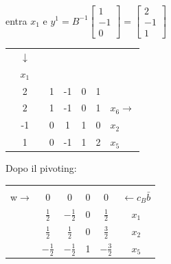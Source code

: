 entra $x_{1}$ e $y^{1}=B^{-1}\begin{bmatrix}1\\-1\\0\end{bmatrix}=\begin{bmatrix}2\\-1\\1\end{bmatrix}$
\begin{table}[H]
	\centering
	\begin{tabular}{r|c|c|ccc|c|l}
		\multicolumn{1}{c}{} & \multicolumn{1}{c}{$\downarrow$} & \multicolumn{1}{c}{} &  &  & \multicolumn{1}{c}{} & \multicolumn{1}{c}{} & \\
		\multicolumn{1}{c}{} & \multicolumn{1}{c}{$x_{1}$} & \multicolumn{1}{c}{} &  &  & \multicolumn{1}{c}{} & \multicolumn{1}{c}{} & \\ \cline{2-2} \cline{4-7}
		& 2 &  & 1 & -1 & 0 & 1 &  \\ \cline{2-2} \cline{4-7}
		& {\LARGE \textcircled{\normalsize $2$}} &  & 1 & -1 & 0 & 1 & $x_{6}\rightarrow$ \\
		& -1 &  & 0 & 1 & 1 & 0 & $x_{2}$ \\
		& 1 &  & 0 & -1 & 1 & 2 & $x_{5}$ \\
		\cline{2-2} \cline{4-7}
	\end{tabular}
\end{table}
\clearpage
Dopo il pivoting:
\begin{table}[!h]
	\def\arraystretch{2.1}
	\centering
	\begin{tabular}{c|ccc|c|c}
		\multicolumn{1}{c}{} & \multicolumn{1}{c}{} & & \multicolumn{1}{c}{} & \multicolumn{1}{c}{} & \\ \cline{2-5}
		w$\rightarrow$ & 0 & 0 & 0 & 0 & $\leftarrow c_{B}\bar{b}$ \\ \cline{2-5}
		& $\frac{1}{2}$ & $-\frac{1}{2}$ & 0 & $\frac{1}{2}$ & $x_{1}$ \\
		& $\frac{1}{2}$ & $\frac{1}{2}$ & 0 & $\frac{3}{2}$ & $x_{2}$ \\
		& $-\frac{1}{2}$ & $-\frac{1}{2}$ & 1 & $-\frac{3}{2}$ & $x_{5}$ \\ \cline{2-5}
	\end{tabular}
\end{table}


